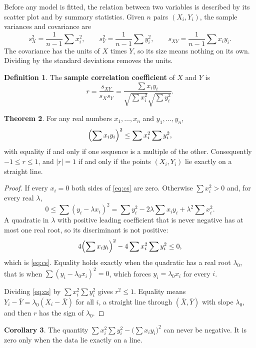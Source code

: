 \documentclass[11pt,a4paper]{article}
\numberwithin{equation}{section}
\theoremstyle{definition}
\newtheorem{thm}{Theorem}[subsection]
\newtheorem{defn}[thm]{Definition}
\newtheorem{coro}[thm]{Corollary}
\begin{document}
Before any model is fitted, the relation between two variables is described by its scatter plot and by summary statistics. Given $n$ pairs
$(X_i, Y_i)$, the sample variances and covariance are
\[
s_X^2 = \frac{1}{n-1}\sum x_i^2, \qquad s_Y^2 = \frac{1}{n-1}\sum y_i^2, \qquad s_{XY} = \frac{1}{n-1}\sum x_i y_i .
\]
The covariance has the units of $X$ times $Y$, so its size means nothing on its own. Dividing by the standard deviations removes the units.

\begin{defn}
The \textbf{sample correlation coefficient} of $X$ and $Y$ is
\[
r = \frac{s_{XY}}{s_X s_Y} = \frac{\sum x_i y_i}{\sqrt{\sum x_i^2}\sqrt{\sum y_i^2}} .
\]
\end{defn}

\begin{thm}
\label{thm:cs}
For any real numbers $x_1, \dots, x_n$ and $y_1, \dots, y_n$,
\begin{equation}
\label{eq:cs}
\Bigl(\sum x_i y_i\Bigr)^2 \leq \sum x_i^2 \sum y_i^2 ,
\end{equation}
with equality if and only if one sequence is a multiple of the other. Consequently $-1 \leq r \leq 1$, and $|r| = 1$ if and only if the points
$(X_i, Y_i)$ lie exactly on a straight line.
\end{thm}

\begin{proof}
If every $x_i = 0$ both sides of \eqref{eq:cs} are zero. Otherwise $\sum x_i^2 > 0$ and, for every real $\lambda$,
\[
0 \leq \sum (y_i - \lambda x_i)^2 = \sum y_i^2 - 2\lambda \sum x_i y_i + \lambda^2 \sum x_i^2 .
\]
A quadratic in $\lambda$ with positive leading coefficient that is never negative has at most one real root, so its discriminant is not positive:
\[
4\Bigl(\sum x_i y_i\Bigr)^2 - 4 \sum x_i^2 \sum y_i^2 \leq 0 ,
\]
which is \eqref{eq:cs}. Equality holds exactly when the quadratic has a real root $\lambda_0$, that is when $\sum (y_i - \lambda_0 x_i)^2 = 0$,
which forces $y_i = \lambda_0 x_i$ for every $i$.

Dividing \eqref{eq:cs} by $\sum x_i^2 \sum y_i^2$ gives $r^2 \leq 1$. Equality means $Y_i - \bar Y = \lambda_0 (X_i - \bar X)$ for all $i$, a straight line
through $(\bar X, \bar Y)$ with slope $\lambda_0$, and then $r$ has the sign of $\lambda_0$.
\end{proof}

\begin{coro}
\label{coro:cs}
The quantity $\sum x_i^2 \sum y_i^2 - \bigl(\sum x_i y_i\bigr)^2$ can never be negative. It is zero only when the data lie exactly on a line.
\end{coro}
\end{document}
